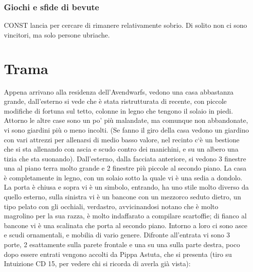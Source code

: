 \documentclass{article}
\begin{document}
\subsubsection{Giochi e sfide di bevute}CONST lancia per cercare di rimanere relativamente sobrio. Di solito non ci sono vincitori, ma solo persone ubriache.
\section{Trama}
    Appena arrivano alla residenza dell’Avendwarfs, vedono una casa abbastanza grande, dall’esterno si vede che è stata ristrutturata di recente, con piccole modifiche di fortuna sul tetto, colonne in legno che tengono il solaio in piedi. Attorno le altre case sono un po’ più malandate, ma comunque non abbandonate, vi sono giardini più o meno incolti. (Se fanno il giro della casa vedono un giardino con vari attrezzi per allenarsi di medio basso valore, nel recinto c`è un bestione che si sta allenando con ascia e scudo contro dei manichini, e su un albero una tizia che sta suonando). Dall’esterno, dalla facciata anteriore, si vedono 3 finestre una al piano terra molto grande e 2 finestre più piccole al secondo piano. La casa è completamente in legno, con un solaio sotto la quale vi è una sedia a dondolo. La porta è chiusa e sopra vi è un simbolo, entrando, ha uno stile molto diverso da quello esterno, sulla sinistra vi è un bancone con un mezzorco seduto dietro, un tipo pelato con gli occhiali, verdastro, avvicinandosi notano che è molto magrolino per la sua razza, è molto indaffarato a compilare scartoffie; di fianco al bancone vi è una scalinata che porta al secondo piano. Intorno a loro ci sono asce e scudi ornamentali, e mobilia di vario genere. Difronte all’entrata vi sono 3 porte, 2 esattamente sulla parete frontale e una su una sulla parte destra, poco dopo essere entrati vengono accolti da Pippa Astuta, che si presenta (tiro su Intuizione CD  15, per vedere chi si ricorda di averla già vista):
\end{document}
